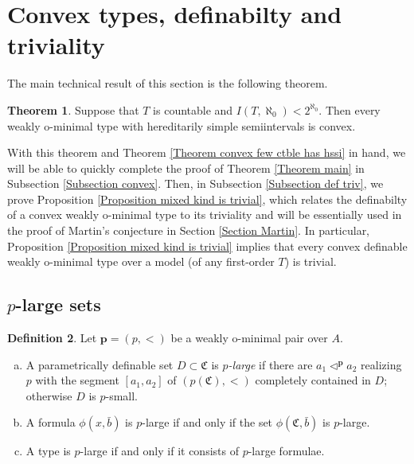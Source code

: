 \documentclass{amsart}
\theoremstyle{definition}
\newtheorem{Theorem}{Theorem}[section]
\theoremstyle{definition}
\newtheorem{Definition}[Theorem]{Definition}
\newcommand{\Mon}{\mathfrak C}
\begin{document}
\section{Convex types, definabilty and triviality}\label{Section 5} 

The main technical result of this section is the following theorem.

\begin{Theorem}\label{Theorem_convex} Suppose that $T$ is countable and $I(T,\aleph_0)<2^{\aleph_0}$. Then every weakly o-minimal type with hereditarily simple semiintervals is convex. 
\end{Theorem}

With this theorem and Theorem \ref{Theorem convex few ctble has hssi} in hand, we will be able to quickly complete the proof of Theorem \ref{Theorem main} in Subsection \ref{Subsection convex}. Then, in Subsection \ref{Subsection def triv}, we prove Proposition \ref{Proposition mixed kind is trivial}, which relates the definabilty of a convex weakly o-minimal type to its triviality and will be essentially used in the proof of Martin's conjecture in Section \ref{Section Martin}. In particular, Proposition \ref{Proposition mixed kind is trivial} implies that every convex definable weakly o-minimal type over a model (of any first-order $T$) is trivial.



\subsection{$p$-large sets} 

\begin{Definition}
Let $\mathbf p=(p,<)$ be a weakly o-minimal pair over $A$.
\begin{enumerate}[(a)]
    \item A parametrically definable set $D\subset \Mon$ is {\it $p$-large} if there are $a_1\triangleleft^{\mathbf p}a_2$ realizing $p$ with the segment $[a_1,a_2]$ of $(p(\Mon),<)$ completely contained in $D$; otherwise $D$ is $p$-small.
    \item A formula $\phi(x,\bar b)$ is $p$-large if and only if the set $\phi(\Mon,\bar b)$ is $p$-large.
    \item A type is $p$-large if and only if it consists of $p$-large formulae.
\end{enumerate}  
\end{Definition}
\end{document}
